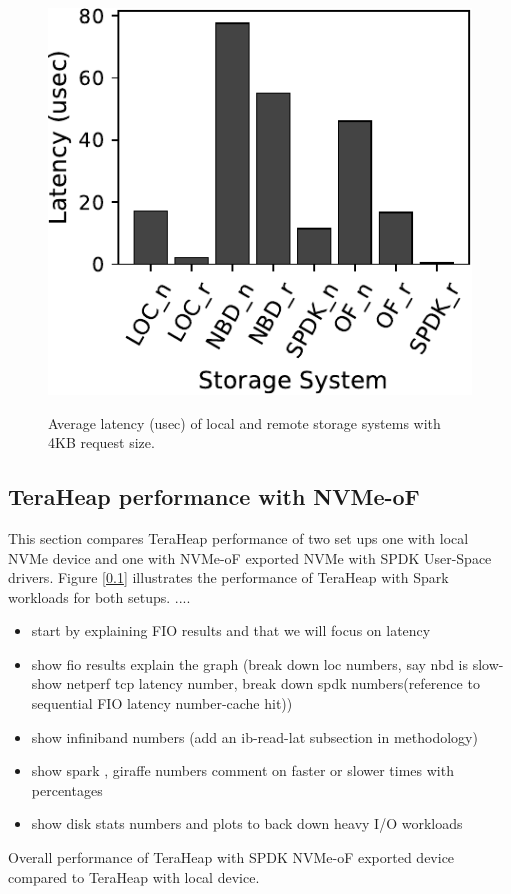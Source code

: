 \begin{figure}[H]
  \includegraphics[width=\linewidth]{asplos25-Thesis/figures/fio_4k.pdf}\\
\caption{Average latency (usec) of local and remote storage systems with 4KB request size.}
\label{fig:fio_4k}
\end{figure}

\subsection{TeraHeap performance with NVMe-oF}
\par This section compares TeraHeap performance of two set ups one with local NVMe device and one with NVMe-oF exported NVMe with SPDK User-Space drivers. Figure [\ref{}] illustrates the performance of TeraHeap with Spark workloads for both setups. ....
\begin{itemize}
    \item start by explaining FIO results and that we will focus on latency
    \item show fio results explain the graph (break down loc numbers, say nbd is slow-show netperf tcp latency number, break down spdk numbers(reference to sequential FIO latency number-cache hit))
    \item show infiniband numbers (add an ib-read-lat subsection in methodology)
    \item show spark , giraffe numbers comment on faster or slower times with percentages
    \item show disk stats numbers and plots to back down heavy I/O workloads
\end{itemize}

Overall performance of TeraHeap with SPDK NVMe-oF exported device compared to TeraHeap with local device.